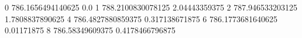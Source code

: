 0 786.1656494140625 0.0
1 788.2100830078125 2.04443359375
2 787.946533203125 1.7808837890625
4 786.4827880859375 0.317138671875
6 786.1773681640625 0.01171875
8 786.58349609375 0.4178466796875
